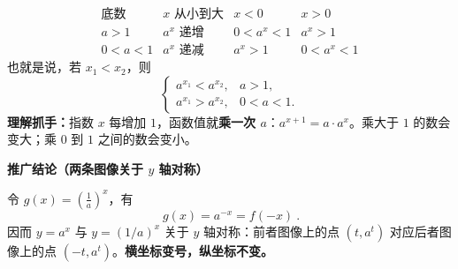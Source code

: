 \begin{statementbox}
\begin{description}[style=nextline, leftmargin=2.8em, labelsep=0.5em, itemsep=0.45em]
    \item[\textbf{\textcolor{CStatement}{结论二（增减由底数决定）：}}]
    \[
        \begin{array}{c|c|c|c}
        \text{底数} & x\text{ 从小到大} & x<0 & x>0\\ \hline
        a>1 & a^x\text{ 递增} & 0<a^x<1 & a^x>1\\
        0<a<1 & a^x\text{ 递减} & a^x>1 & 0<a^x<1
        \end{array}
    \]
    也就是说，若 $x_1<x_2$，则
    \[
        \begin{cases}
        a^{x_1}<a^{x_2},& a>1,\\
        a^{x_1}>a^{x_2},& 0<a<1.
        \end{cases}
    \]
    \textbf{理解抓手：}指数 $x$ 每增加 $1$，函数值就\textbf{乘一次 $a$}：$a^{x+1}=a\cdot a^x$。乘大于 $1$ 的数会变大；乘 $0$ 到 $1$ 之间的数会变小。
\end{description}

\textbf{\textcolor{CStatement}{推广结论（两条图像关于 $y$ 轴对称）}}
\begin{description}[style=nextline, leftmargin=2.8em, labelsep=0.5em, itemsep=0.45em]
    \item[\textbf{\textcolor{CStatement}{底数互为倒数：}}]
    令 $g(x)=\left(\frac1a\right)^x$，有
    \[
        \boxed{\ g(x)=a^{-x}=f(-x)\ }.
    \]
    因而 $y=a^x$ 与 $y=(1/a)^x$ 关于 $y$ 轴对称：前者图像上的点 $(t,a^t)$ 对应后者图像上的点 $(-t,a^t)$。\textbf{横坐标变号，纵坐标不变。}
\end{description}

\end{statementbox}
